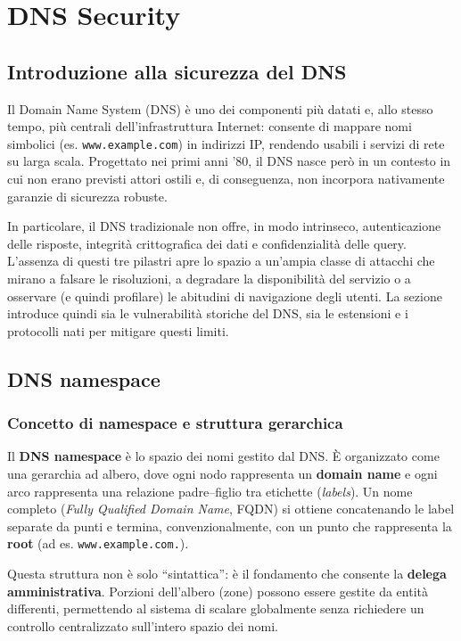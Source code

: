 \section{DNS Security}

\subsection{Introduzione alla sicurezza del DNS}
Il Domain Name System (DNS) è uno dei componenti più datati e, allo stesso tempo, più centrali dell’infrastruttura Internet: consente di mappare nomi simbolici (es. \texttt{www.example.com}) in indirizzi IP, rendendo usabili i servizi di rete su larga scala. Progettato nei primi anni ’80, il DNS nasce però in un contesto in cui non erano previsti attori ostili e, di conseguenza, non incorpora nativamente garanzie di sicurezza robuste.

In particolare, il DNS tradizionale non offre, in modo intrinseco, autenticazione delle risposte, integrità crittografica dei dati e confidenzialità delle query. L’assenza di questi tre pilastri apre lo spazio a un’ampia classe di attacchi che mirano a falsare le risoluzioni, a degradare la disponibilità del servizio o a osservare (e quindi profilare) le abitudini di navigazione degli utenti. La sezione introduce quindi sia le vulnerabilità storiche del DNS, sia le estensioni e i protocolli nati per mitigare questi limiti.

\subsection{DNS namespace}

\subsubsection{Concetto di namespace e struttura gerarchica}
Il \textbf{DNS namespace} è lo spazio dei nomi gestito dal DNS. È organizzato come una gerarchia ad albero, dove ogni nodo rappresenta un \textbf{domain name} e ogni arco rappresenta una relazione padre--figlio tra etichette (\emph{labels}). Un nome completo (\emph{Fully Qualified Domain Name}, FQDN) si ottiene concatenando le label separate da punti e termina, convenzionalmente, con un punto che rappresenta la \textbf{root} (ad es. \texttt{www.example.com.}).

Questa struttura non è solo “sintattica”: è il fondamento che consente la \textbf{delega amministrativa}. Porzioni dell’albero (zone) possono essere gestite da entità differenti, permettendo al sistema di scalare globalmente senza richiedere un controllo centralizzato sull’intero spazio dei nomi.

